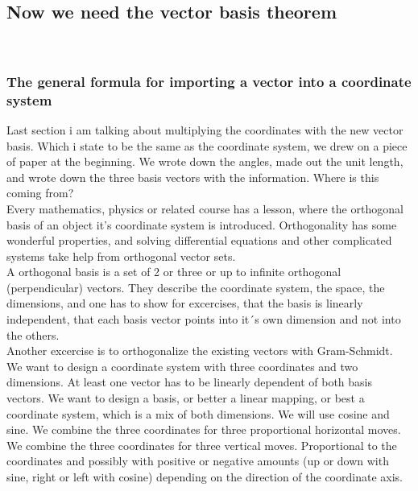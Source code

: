 \documentclass[a4paper]{article}
\begin{document}
\begin{Example}
\subsection{Now we need the vector basis theorem}\\

\subsubsection{The general formula for importing a vector into a coordinate system}

Last section i am talking about multiplying the coordinates with the new vector basis. Which i state to be the same as the coordinate system, we drew on a piece of paper at the beginning. We wrote down the angles, made out the unit length, and wrote down the three basis vectors with the information. Where is this coming from?\\

Every mathematics, physics or related course has a lesson, where the orthogonal basis of an object it's coordinate system is introduced. Orthogonality has some wonderful properties, and solving differential equations and other complicated systems take help from orthogonal vector sets.\\

A orthogonal basis is a set of 2 or three or up to infinite orthogonal (perpendicular) vectors. They describe the coordinate system, the space, the dimensions, and one has to show for excercises, that the basis is linearly independent, that each basis vector points into it´s own dimension and not into the others. \\

Another excercise is to orthogonalize the existing vectors with Gram-Schmidt. \\

We want to design a coordinate system with three coordinates and two dimensions. At least one vector has to be linearly dependent of both basis vectors. We want to design a basis, or better a linear mapping, or best a coordinate system, which is a mix of both dimensions. We will use cosine and sine. We combine the three coordinates for three proportional horizontal moves. We combine the three coordinates for three vertical moves. Proportional to the coordinates and possibly with positive or negative amounts (up or down with sine, right or left with cosine) depending on the direction of the coordinate axis.\\


\end{Example}
\end{document}
